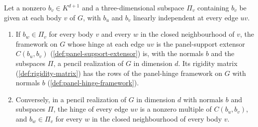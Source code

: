 \begin{lemma}
  \label{lem:pencil-d-point-configuration}
  \leanok
  Let a nonzero $b_v \in K^{d+1}$ and a three-dimensional subspace
  $\Pi_v$ containing $b_v$ be given at each body $v$ of $G$, with $b_u$
  and $b_v$ linearly independent at every edge $uv$.
  \begin{enumerate}
    \item If $b_w \in \Pi_v$ for every body $v$ and every $w$ in the
          closed neighbourhood of $v$, the framework on $G$ whose hinge
          at each edge $uv$ is the panel-support extensor $C(b_u, b_v)$
          (\cref{def:panel-support-extensor}) is, with the normals $b$
          and the subspaces $\Pi$, a pencil realization of $G$ in
          dimension $d$. Its rigidity matrix (\cref{def:rigidity-matrix})
          has the rows of the panel-hinge framework on $G$ with normals
          $b$ (\cref{def:panel-hinge-framework}).
    \item Conversely, in a pencil realization of $G$ in dimension $d$
          with normals $b$ and subspaces $\Pi$, the hinge of every edge
          $uv$ is a nonzero multiple of $C(b_u, b_v)$, and $b_w \in \Pi_v$
          for every $w$ in the closed neighbourhood of every body $v$.
  \end{enumerate}
\end{lemma}
